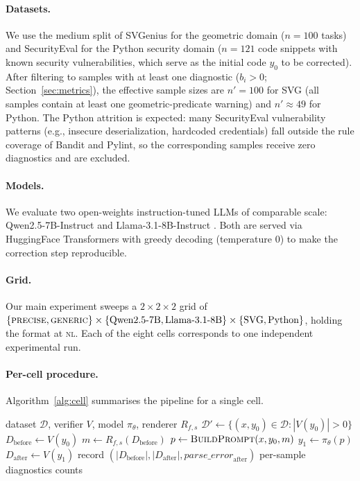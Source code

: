 \paragraph{Datasets.}
We use the medium split of SVGenius \cite{cao2024svgenius} for the geometric domain ($n=100$ tasks) and SecurityEval \cite{siddiq2022securityeval} for the Python security domain ($n=121$ code snippets with known security vulnerabilities, which serve as the initial code $y_0$ to be corrected). After filtering to samples with at least one diagnostic ($b_i > 0$; Section~\ref{sec:metrics}), the effective sample sizes are $n' = 100$ for SVG (all samples contain at least one geometric-predicate warning) and $n' \approx 49$ for Python. The Python attrition is expected: many SecurityEval vulnerability patterns (e.g., insecure deserialization, hardcoded credentials) fall outside the rule coverage of Bandit and Pylint, so the corresponding samples receive zero diagnostics and are excluded.

\paragraph{Models.}
We evaluate two open-weights instruction-tuned LLMs of comparable scale: Qwen2.5-7B-Instruct \cite{yang2024qwen25} and Llama-3.1-8B-Instruct \cite{grattafiori2024llama3}. Both are served via HuggingFace Transformers with greedy decoding (temperature $0$) to make the correction step reproducible.

\paragraph{Grid.}
Our main experiment sweeps a $2\times 2 \times 2$ grid of $\{\textsc{precise}, \textsc{generic}\} \times \{\text{Qwen2.5-7B}, \text{Llama-3.1-8B}\} \times \{\text{SVG}, \text{Python}\}$, holding the format at \textsc{nl}. Each of the eight cells corresponds to one independent experimental run.

\paragraph{Per-cell procedure.}
Algorithm~\ref{alg:cell} summarises the pipeline for a single cell.

\begin{algorithm}[t]
\small
\caption{Single cell evaluation}
\label{alg:cell}
\begin{algorithmic}[1]
\Require dataset $\mathcal{D}$, verifier $V$, model $\pi_\theta$, renderer $R_{f,s}$
\State $\mathcal{D}' \gets \{(x, y_0) \in \mathcal{D} : |V(y_0)| > 0\}$ 
    \State $D_{\text{before}} \gets V(y_0)$
    \State $m \gets R_{f,s}(D_{\text{before}})$ 
    \State $p \gets \textsc{BuildPrompt}(x, y_0, m)$
    \State $y_1 \gets \pi_\theta(p)$ 
    \State $D_{\text{after}} \gets V(y_1)$
    \State record $(|D_{\text{before}}|, |D_{\text{after}}|, \textit{parse\_error}_{\text{after}})$
\EndFor
\State \Return per-sample diagnostics counts
\end{algorithmic}
\end{algorithm}

